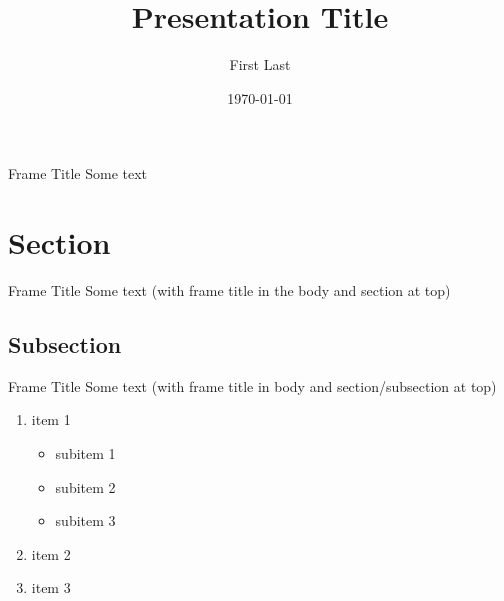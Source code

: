 \documentclass[10pt]{beamer}
\author{First Last}
\title[CUDenver Theme]{Presentation Title}
\institute{University of Colorado Denver}
\date{\today}
\begin{document}
\begin{frame}[t,plain]
    \titlepage
\end{frame}


\begin{frame}[t]{Frame Title}
    Some text
\end{frame}
\section{Section}
\begin{frame}[t]{Frame Title}
    Some text (with frame title in the body and section at top)
\end{frame}
\subsection{Subsection}
\begin{frame}[t]{Frame Title}
    Some text (with frame title in body and section/subsection at top)
\end{frame}
\begin{frame}[t]
    \begin{enumerate}
    \item item 1
        \begin{itemize}
	    \item subitem 1
	    \item subitem 2
	    \item subitem 3
	\end{itemize}
    \item item 2
    \item item 3
    \end{enumerate}
\end{frame}
\end{document}
